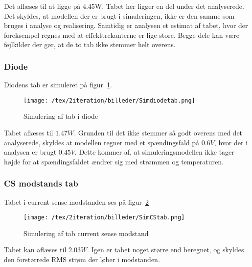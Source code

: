 Det aflæses til at ligge på 4.45W. Tabet her ligger en del  under det analyserede. Det skyldes, at modellen der er brugt i simuleringen, ikke er den samme som bruges i analyse og realisering. Samtidig er analysen et estimat af tabet, hvor der foreksempel regnes med at effekttrekanterne er lige store. Begge dele kan være fejlkilder der gør, at de to tab ikke stemmer helt overens.  

\subsubsection{Diode}
\noindent Diodens tab er simuleret på figur~\ref{fig: simdiodetab}. 
\begin{figure}[H]
	\center
	\texttt{[image: /tex/2iteration/billeder/Simdiodetab.png]}
	\caption{Simulering af tab i diode}
	\label{fig: simdiodetab}
\end{figure}
Tabet aflæses til $1.47W$. Grunden til det ikke stemmer så godt overens med det analyserede, skyldes at modellen regner med et spændingsfald på $0.6V$, hvor der i analysen er brugt $0.45V$. Dette kommer af, at simuleringsmodellen ikke tager højde for at spændingsfaldet ændrer sig med strømmen og temperaturen. 

\subsubsection{CS modstands tab}
\noindent Tabet i current sense modstanden ses på figur~\ref{fig: simdCStab}
\begin{figure}[H]
	\center
	\texttt{[image: /tex/2iteration/billeder/SimCStab.png]}
	\caption{Simulering af tab current sense modstand}
	\label{fig: simdCStab}
\end{figure}
Tabet kan aflæses til $2.03W$. Igen er tabet noget større end beregnet, og skyldes den forstørrede RMS strøm der løber i modstanden.

